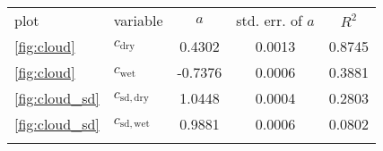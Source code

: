 \begin{tabular}{llccc}
\tophline
               plot &                         variable &     $a$ & std. err. of $a$ &  $R^2$ \\
\middlehline
 \ref{fig:cloud} &  $c_{\mathrm{dry}}$ & 0.4302 & 0.0013 & 0.8745 \\
 \ref{fig:cloud} &  $c_{\mathrm{wet}}$ & -0.7376 & 0.0006 & 0.3881 \\
 \ref{fig:cloud_sd} &  $c_{\mathrm{sd}, \mathrm{dry}}$ & 1.0448 & 0.0004 & 0.2803 \\
 \ref{fig:cloud_sd} &  $c_{\mathrm{sd}, \mathrm{wet}}$ & 0.9881 & 0.0006 & 0.0802 \\
\bottomhline
\end{tabular}
